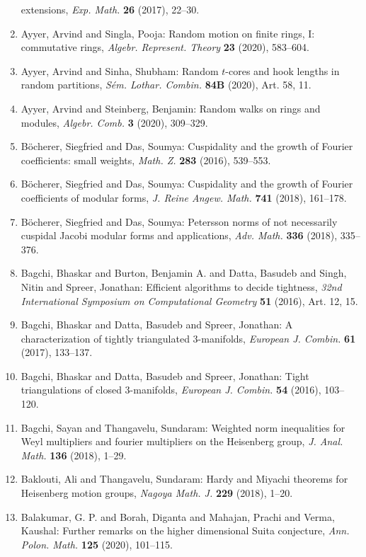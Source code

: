 \begin{enumerate}
extensions, \emph{Exp. Math.} {\bf 26} (2017), 22--30.
\item Ayyer, Arvind and Singla, Pooja: Random motion on finite rings, {I}: commutative rings, \emph{Algebr. Represent. Theory} {\bf 23} (2020), 583--604.
\item Ayyer, Arvind and Sinha, Shubham: Random {$t$}-cores and hook lengths in random partitions, \emph{S\'{e}m. Lothar. Combin.} {\bf 84B} (2020), Art. 58, 11.
\item Ayyer, Arvind and Steinberg, Benjamin: Random walks on rings and modules, \emph{Algebr. Comb.} {\bf 3} (2020), 309--329.
\item B\"{o}cherer, Siegfried and Das, Soumya: Cuspidality and the growth of {F}ourier coefficients: small
weights, \emph{Math. Z.} {\bf 283} (2016), 539--553.
\item B\"{o}cherer, Siegfried and Das, Soumya: Cuspidality and the growth of {F}ourier coefficients of
modular forms, \emph{J. Reine Angew. Math.} {\bf 741} (2018), 161--178.
\item B\"{o}cherer, Siegfried and Das, Soumya: Petersson norms of not necessarily cuspidal {J}acobi modular
forms and applications, \emph{Adv. Math.} {\bf 336} (2018), 335--376.
\item Bagchi, Bhaskar and Burton, Benjamin A. and Datta, Basudeb and
Singh, Nitin and Spreer, Jonathan: Efficient algorithms to decide tightness, \emph{32nd {I}nternational {S}ymposium on {C}omputational
{G}eometry} {\bf 51} (2016), Art. 12, 15.
\item Bagchi, Bhaskar and Datta, Basudeb and Spreer, Jonathan: A characterization of tightly triangulated 3-manifolds, \emph{European J. Combin.} {\bf 61} (2017), 133--137.
\item Bagchi, Bhaskar and Datta, Basudeb and Spreer, Jonathan: Tight triangulations of closed 3-manifolds, \emph{European J. Combin.} {\bf 54} (2016), 103--120.
\item Bagchi, Sayan and Thangavelu, Sundaram: Weighted norm inequalities for {W}eyl multipliers and fourier
multipliers on the {H}eisenberg group, \emph{J. Anal. Math.} {\bf 136} (2018), 1--29.
\item Baklouti, Ali and Thangavelu, Sundaram: Hardy and {M}iyachi theorems for {H}eisenberg motion groups, \emph{Nagoya Math. J.} {\bf 229} (2018), 1--20.
\item Balakumar, G. P. and Borah, Diganta and Mahajan, Prachi and
Verma, Kaushal: Further remarks on the higher dimensional {S}uita conjecture, \emph{Ann. Polon. Math.} {\bf 125} (2020), 101--115.

\end{enumerate}
